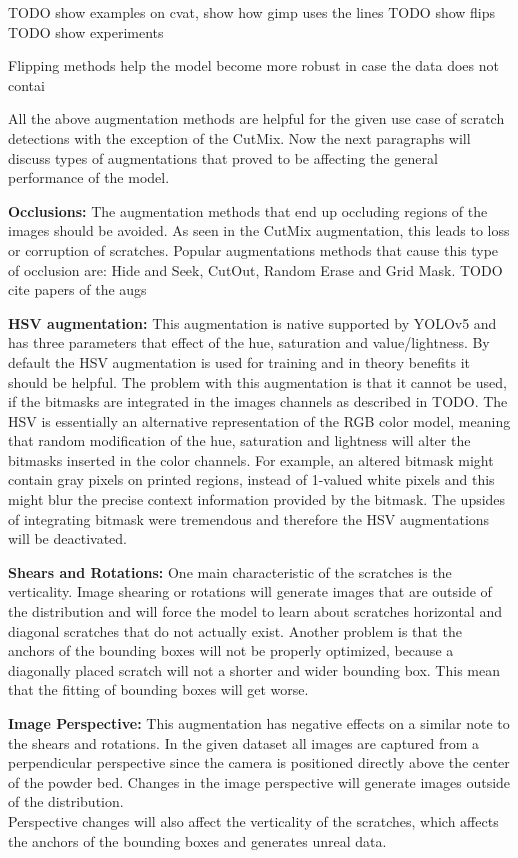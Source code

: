 TODO show examples on cvat, show how gimp uses the lines
TODO show flips
TODO show experiments

Flipping methods help the model become more robust in case the data does not contai


All the above augmentation methods are helpful for the given use case of scratch detections with the exception of the CutMix. Now the next paragraphs will discuss types of augmentations that proved to be affecting the general performance of the model.

\textbf{Occlusions:} The augmentation methods that end up occluding regions of the images should be avoided. As seen in the CutMix augmentation, this leads to loss or corruption of scratches. Popular augmentations methods that cause this type of occlusion are: Hide and Seek, CutOut, Random Erase and Grid Mask. TODO cite papers of the augs

\textbf{HSV augmentation:} This augmentation is native supported by YOLOv5 and has three parameters that effect of the hue, saturation and value/lightness. By default the HSV augmentation is used for training and in theory benefits it should be helpful. The problem with this augmentation is that it cannot be used, if the bitmasks are integrated in the images channels as described in TODO. The HSV is essentially an alternative representation of the RGB color model, meaning that random modification of the hue, saturation and lightness will alter the bitmasks inserted in the color channels. For example, an altered bitmask might contain gray pixels on printed regions, instead of 1-valued white pixels and this might blur the precise context information provided by the bitmask. The upsides of integrating bitmask were tremendous and therefore the HSV augmentations will be deactivated.

\textbf{Shears and Rotations:} One main characteristic of the scratches is the verticality. Image shearing or rotations will generate images that are outside of the distribution and will force the model to learn about scratches horizontal and diagonal scratches that do not actually exist. Another problem is that the anchors of the bounding boxes will not be properly optimized, because a diagonally placed scratch will not a shorter and wider bounding box. This mean that the fitting of bounding boxes will get worse.

\textbf{Image Perspective:} This augmentation has negative effects on a similar note to the shears and rotations. In the given dataset all images are captured from a perpendicular perspective since the camera is positioned directly above the center of the powder bed. Changes in the image perspective will generate images outside of the distribution. \\
Perspective changes will also affect the verticality of the scratches, which affects the anchors of the bounding boxes and generates unreal data. \\

